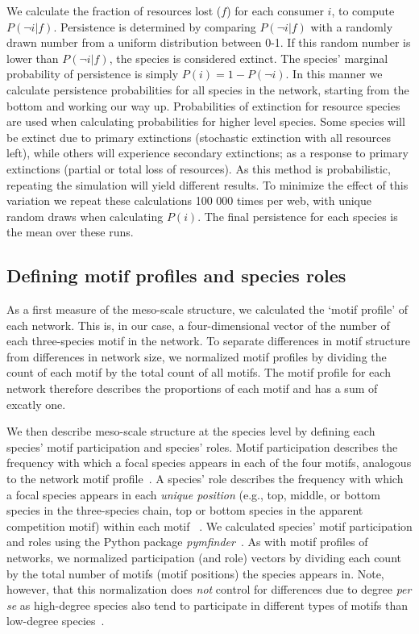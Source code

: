 \documentclass[12pt]{article}
\begin{document}
\begin{spacing}{2.0}
		We calculate the fraction of resources lost ($f$) for each consumer $i$, to compute $P(\lnot i|f)$. 
		Persistence is determined by comparing $P(\lnot i|f)$ with a randomly drawn number from a uniform distribution between 0-1. 
		If this random number is lower than $P(\lnot i|f)$, the species is considered extinct. 
		The species' marginal probability of persistence is simply $P(i) = 1-P(\lnot i)$.
		In this manner we calculate persistence probabilities for all species in the network, starting from the bottom and working our way up. 
		Probabilities of extinction for resource species are used when calculating probabilities for higher level species. 
		Some species will be extinct due to primary extinctions (stochastic extinction with all resources left), while others will experience secondary extinctions; as a response to primary extinctions (partial or total loss of resources). 
		As this method is probabilistic, repeating the simulation will yield different results. 
		To minimize the effect of this variation we repeat these calculations 100 000 times per web, with unique random draws when calculating $P(i)$.
		The final persistence for each species is the mean over these runs. 

	\subsection*{Defining motif profiles and species roles}

        As a first measure of the meso-scale structure, we calculated the `motif profile' of each network.
        This is, in our case, a four-dimensional vector of the number of each three-species motif in the network.
        To separate differences in motif structure from differences in network size, we normalized motif profiles by dividing the count of each motif by the total count of all motifs.
        The motif profile for each network therefore describes the proportions of each motif and has a sum of excatly one.

    
        We then describe meso-scale structure at the species level by defining each species' motif participation and species' roles.
        Motif participation describes the frequency with which a focal species appears in each of the four motifs, analogous to the network motif profile~\citep{Stouffer2012}.
        A species' role describes the frequency with which a focal species appears in each \emph{unique position} (e.g., top, middle, or bottom species in the three-species chain, top or bottom species in the apparent competition motif) within each motif ~\citep{Stouffer2012,Cirtwill2017}.
		We calculated species' motif participation and roles using the Python package \emph{pymfinder}~\citep{pymfinder}.
        As with motif profiles of networks, we normalized participation (and role) vectors by dividing each count by the total number of motifs (motif positions) the species appears in.
        Note, however, that this normalization does \emph{not} control for differences due to degree \emph{per se} as high-degree species also tend to participate in different types of motifs than low-degree species~\citep{Cirtwill2021_inprep}.
        

\end{spacing}
\end{document}
